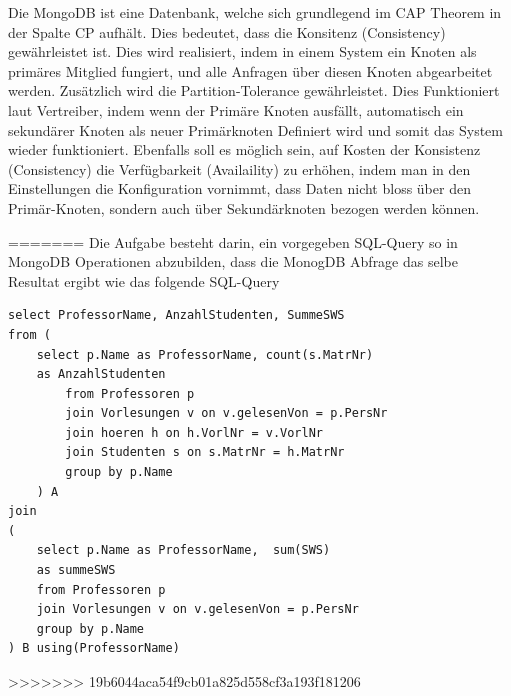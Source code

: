 Die MongoDB ist eine Datenbank, welche sich grundlegend im CAP Theorem in der Spalte CP aufhält. Dies bedeutet, dass die Konsitenz (Consistency) gewährleistet ist. Dies wird realisiert, indem in einem System ein Knoten als primäres Mitglied fungiert, und alle Anfragen über diesen Knoten abgearbeitet werden. Zusätzlich wird die Partition-Tolerance gewährleistet. Dies Funktioniert laut Vertreiber, indem wenn der Primäre Knoten ausfällt, automatisch ein sekundärer Knoten als neuer Primärknoten Definiert wird und somit das System wieder funktioniert.
Ebenfalls soll es möglich sein, auf Kosten der Konsistenz (Consistency) die Verfügbarkeit (Availaility) zu erhöhen, indem man in den Einstellungen die Konfiguration vornimmt, dass Daten nicht bloss über den Primär-Knoten, sondern auch über Sekundärknoten bezogen werden können.


%
=======
Die Aufgabe besteht darin, ein vorgegeben SQL-Query so in MongoDB Operationen
abzubilden, dass die MonogDB Abfrage das selbe Resultat ergibt wie das folgende 
SQL-Query
\begin{lstlisting}
select ProfessorName, AnzahlStudenten, SummeSWS 
from ( 
	select p.Name as ProfessorName, count(s.MatrNr) 
	as AnzahlStudenten 
		from Professoren p 
		join Vorlesungen v on v.gelesenVon = p.PersNr
		join hoeren h on h.VorlNr = v.VorlNr 
		join Studenten s on s.MatrNr = h.MatrNr 
		group by p.Name 
	) A 
join 
( 
	select p.Name as ProfessorName,  sum(SWS) 
	as summeSWS 
	from Professoren p 
	join Vorlesungen v on v.gelesenVon = p.PersNr 
	group by p.Name 
) B using(ProfessorName)
\end{lstlisting}
>>>>>>> 19b6044aca54f9cb01a825d558cf3a193f181206
